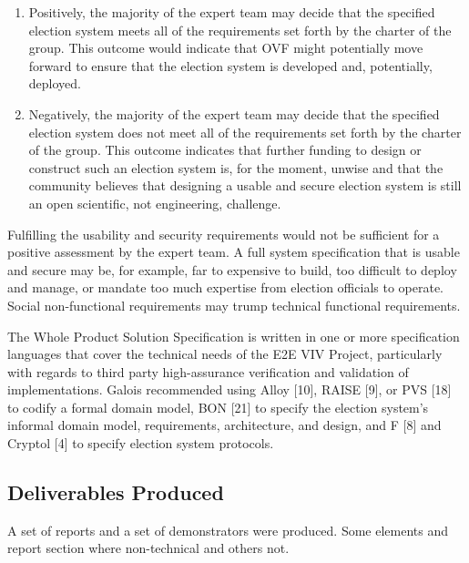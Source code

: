 \begin{enumerate}
\item Positively, the majority of the expert team may decide that the
  specified election system meets all of the requirements set forth by
  the charter of the group. This outcome would indicate that OVF might
  potentially move forward to ensure that the election system is
  developed and, potentially, deployed.
\item Negatively, the majority of the expert team may decide that the
  specified election system does not meet all of the requirements set
  forth by the charter of the group. This outcome indicates that
  further funding to design or construct such an election system is,
  for the moment, unwise and that the community believes that
  designing a usable and secure election system is still an open
  scientific, not engineering, challenge. 
\end{enumerate}

Fulfilling the usability and security requirements would not be
sufficient for a positive assessment by the expert team. A full system
specification that is usable and secure may be, for example, far to
expensive to build, too difficult to deploy and manage, or mandate too
much expertise from election officials to operate. Social
non-functional requirements may trump technical functional
requirements. 

The Whole Product Solution Specification is written in one or more
specification languages that cover the technical needs of the E2E VIV
Project, particularly with regards to third party high-assurance
verification and validation of implementations. Galois recommended
using Alloy [10], RAISE [9], or PVS [18] to codify a formal domain
model, BON [21] to specify the election system's informal domain
model, requirements, architecture, and design, and F [8] and Cryptol
[4] to specify election system protocols. 

\subsection{Deliverables Produced}
\label{sec:deliv-prod}

A set of reports and a set of demonstrators were produced. Some
elements and report section where non-technical and others not. 

